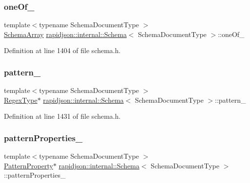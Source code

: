 \subsubsection{\texorpdfstring{oneOf\_}{oneOf\_}}
{\footnotesize\ttfamily template$<$typename Schema\+Document\+Type $>$ \\
\mbox{\hyperlink{structrapidjson_1_1internal_1_1_schema_1_1_schema_array}{Schema\+Array}} \mbox{\hyperlink{classrapidjson_1_1internal_1_1_schema}{rapidjson\+::internal\+::\+Schema}}$<$ Schema\+Document\+Type $>$\+::one\+Of\+\_\+\hspace{0.3cm}{\ttfamily [private]}}



Definition at line 1404 of file schema.\+h.

\mbox{\label{classrapidjson_1_1internal_1_1_schema_ae8306d996b2144b563f508f8fe7ae8ba}} 
\subsubsection{\texorpdfstring{pattern\_}{pattern\_}}
{\footnotesize\ttfamily template$<$typename Schema\+Document\+Type $>$ \\
\mbox{\hyperlink{classrapidjson_1_1internal_1_1_schema_a2c16b06523df78f5c354e9a68da90e23}{Regex\+Type}}$\ast$ \mbox{\hyperlink{classrapidjson_1_1internal_1_1_schema}{rapidjson\+::internal\+::\+Schema}}$<$ Schema\+Document\+Type $>$\+::pattern\+\_\+\hspace{0.3cm}{\ttfamily [private]}}



Definition at line 1431 of file schema.\+h.

\mbox{\label{classrapidjson_1_1internal_1_1_schema_afbfcc72fa7ff7e3a9ae8f0f43d58aca5}} 
\subsubsection{\texorpdfstring{patternProperties\_}{patternProperties\_}}
{\footnotesize\ttfamily template$<$typename Schema\+Document\+Type $>$ \\
\mbox{\hyperlink{structrapidjson_1_1internal_1_1_schema_1_1_pattern_property}{Pattern\+Property}}$\ast$ \mbox{\hyperlink{classrapidjson_1_1internal_1_1_schema}{rapidjson\+::internal\+::\+Schema}}$<$ Schema\+Document\+Type $>$\+::pattern\+Properties\+\_\+\hspace{0.3cm}{\ttfamily [private]}}



